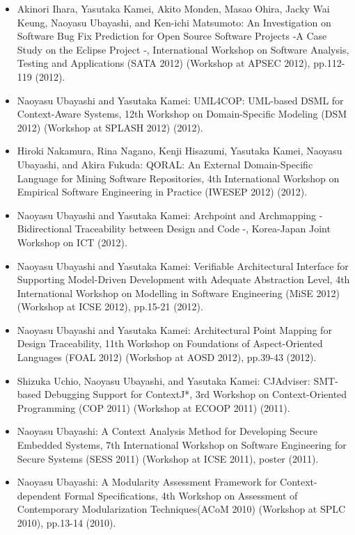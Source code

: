 \documentclass{jarticle}
\begin{document}
\begin{itemize}
\item Akinori Ihara, Yasutaka Kamei, Akito Monden, Masao Ohira, Jacky Wai Keung, Naoyasu Ubayashi, and Ken-ichi Matsumoto:
An Investigation on Software Bug Fix Prediction for Open Source Software Projects -A Case Study on the Eclipse Project -,
International Workshop on Software Analysis, Testing and Applications (SATA 2012) (Workshop at APSEC 2012), pp.112-119 (2012).

\item Naoyasu Ubayashi and Yasutaka Kamei:
UML4COP: UML-based DSML for Context-Aware Systems,
12th Workshop on Domain-Specific Modeling (DSM 2012) (Workshop at SPLASH 2012) (2012).

\item Hiroki Nakamura, Rina Nagano, Kenji Hisazumi, Yasutaka Kamei, Naoyasu Ubayashi, and Akira Fukuda:
QORAL: An External Domain-Specific Language for Mining Software Repositories,
4th International Workshop on Empirical Software Engineering in Practice (IWESEP 2012) (2012).

\item Naoyasu Ubayashi and Yasutaka Kamei:
Archpoint and Archmapping - Bidirectional Traceability between Design and Code -,
Korea-Japan Joint Workshop on ICT (2012).

\item Naoyasu Ubayashi and Yasutaka Kamei:
Verifiable Architectural Interface for Supporting Model-Driven Development with Adequate Abstraction Level,
4th International Workshop on Modelling in Software Engineering (MiSE 2012) (Workshop at ICSE 2012), pp.15-21 (2012).

\item Naoyasu Ubayashi and Yasutaka Kamei:
Architectural Point Mapping for Design Traceability,
11th Workshop on Foundations of Aspect-Oriented Languages (FOAL 2012) (Workshop at AOSD 2012), pp.39-43 (2012).

\item Shizuka Uchio, Naoyasu Ubayashi, and Yasutaka Kamei:
CJAdviser: SMT-based Debugging Support for ContextJ*,
3rd Workshop on Context-Oriented Programming (COP 2011) (Workshop at ECOOP 2011) (2011).

\item Naoyasu Ubayashi:
A Context Analysis Method for Developing Secure Embedded Systems,
7th International Workshop on Software Engineering for Secure Systems (SESS 2011) (Workshop at ICSE 2011), poster (2011).

\item Naoyasu Ubayashi:
A Modularity Assessment Framework for Context-dependent Formal Specifications,
4th Workshop on Assessment of Contemporary Modularization Techniques(ACoM 2010) (Workshop at SPLC 2010),
pp.13-14 (2010).


\end{itemize}
\end{document}
